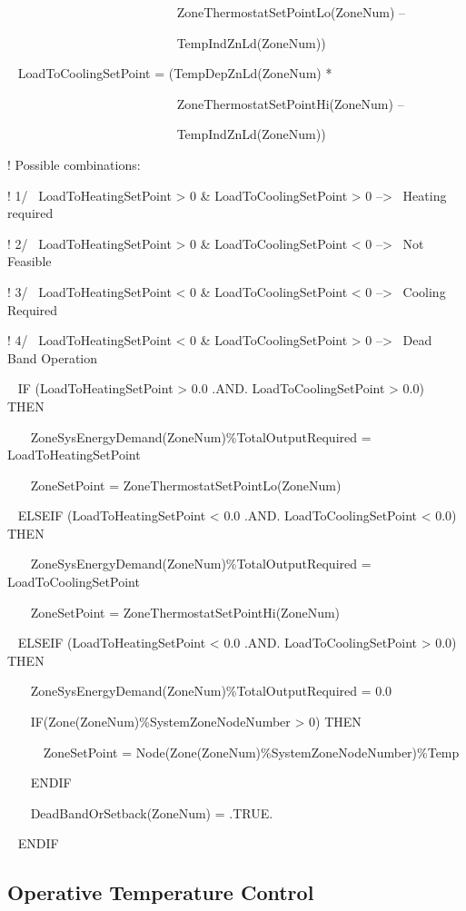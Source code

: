 ~~~~~~~~~~~~~~~~~~~~~~~~~ ~ZoneThermostatSetPointLo(ZoneNum) --

~~~~~~~~~~~~~~~~~~~~~~~~~~ TempIndZnLd(ZoneNum))

~ LoadToCoolingSetPoint = (TempDepZnLd(ZoneNum) *

~~~~~~~~~~~~~~~~~~~~~~~~~ ~ZoneThermostatSetPointHi(ZoneNum) --

~~~~~~~~~~~~~~~~~~~~~~~~~~ TempIndZnLd(ZoneNum))

! Possible combinations:

! 1/~ LoadToHeatingSetPoint \textgreater{} 0 \& LoadToCoolingSetPoint \textgreater{} 0 --\textgreater{}~ Heating required

! 2/~ LoadToHeatingSetPoint \textgreater{} 0 \& LoadToCoolingSetPoint \textless{} 0 --\textgreater{}~ Not Feasible

! 3/~ LoadToHeatingSetPoint \textless{} 0 \& LoadToCoolingSetPoint \textless{} 0 --\textgreater{}~ Cooling Required

! 4/~ LoadToHeatingSetPoint \textless{} 0 \& LoadToCoolingSetPoint \textgreater{} 0 --\textgreater{}~ Dead Band Operation

~ IF (LoadToHeatingSetPoint \textgreater{} 0.0 .AND. LoadToCoolingSetPoint \textgreater{} 0.0) THEN

~~~ ZoneSysEnergyDemand(ZoneNum)\%TotalOutputRequired = LoadToHeatingSetPoint

~~~ ZoneSetPoint = ZoneThermostatSetPointLo(ZoneNum)

~ ELSEIF (LoadToHeatingSetPoint \textless{} 0.0 .AND. LoadToCoolingSetPoint \textless{} 0.0) THEN

~~~ ZoneSysEnergyDemand(ZoneNum)\%TotalOutputRequired = LoadToCoolingSetPoint

~~~ ZoneSetPoint = ZoneThermostatSetPointHi(ZoneNum)

~ ELSEIF (LoadToHeatingSetPoint \textless{} 0.0 .AND. LoadToCoolingSetPoint \textgreater{} 0.0) THEN

~~~ ZoneSysEnergyDemand(ZoneNum)\%TotalOutputRequired = 0.0

~~~ IF(Zone(ZoneNum)\%SystemZoneNodeNumber \textgreater{} 0) THEN

~~~~~ ZoneSetPoint = Node(Zone(ZoneNum)\%SystemZoneNodeNumber)\%Temp

~~~ ENDIF

~~~ DeadBandOrSetback(ZoneNum) = .TRUE.

~ ENDIF

\subsection{Operative Temperature Control}\label{operative-temperature-control}

